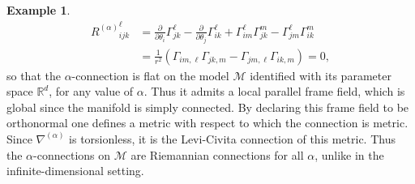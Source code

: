 \documentclass[11pt,reqno]{amsart}
\theoremstyle{definition}
\newtheorem{example}[theorem]{Example}
\newcommand{\R}{\mathbb R}
\newcommand{\Prob}{\operatorname{Prob}(M)}
\newcommand{\orange}[1]{{\color{orange}#1}}
\begin{document}
\begin{example}
\begin{align*}
{R^{(\alpha)}}_{ijk}^\ell&=\frac{\partial}{\partial\theta_i}\Gamma_{jk}^\ell -\frac{\partial}{\partial\theta_j}\Gamma_{ik}^\ell+\Gamma_{im}^\ell\Gamma_{jk}^m-\Gamma_{jm}^\ell\Gamma_{ik}^m\\
&=\frac{1}{r^2}\left(\Gamma_{im,\ell}\Gamma_{jk,m}-\Gamma_{jm,\ell}\Gamma_{ik,m}\right)=0,
\end{align*}
so that the $\alpha$-connection is flat on the model $\mathcal M$ identified with its parameter space $\R^d$, for any value of $\alpha$. Thus it admits a local parallel frame field, which is global since the manifold is simply connected. By declaring this frame field to be orthonormal one defines a metric with respect to which the connection is metric. Since $\nabla^{(\alpha)}$ is torsionless, it is the Levi-Civita connection of this metric.
Thus the $\alpha$-connections on $\mathcal M$ are Riemannian connections for all $\alpha$, unlike in the infinite-dimensional setting.
\end{example}
\end{document}
